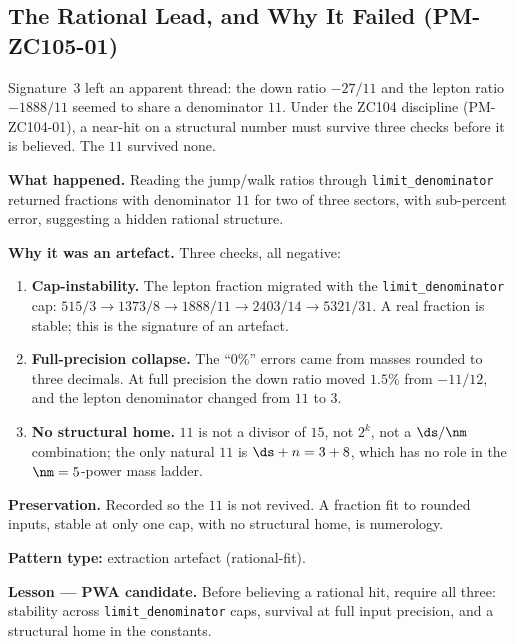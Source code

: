 \documentclass[12pt, a4paper]{article}
\begin{document}
\subsection{The Rational Lead, and Why It Failed (PM-ZC105-01)}
\label{sec:rationale-zc105}

Signature~3 left an apparent thread: the down ratio $-27/11$ and the lepton
ratio $-1888/11$ seemed to share a denominator $11$. Under the ZC104 discipline
(PM-ZC104-01), a near-hit on a structural number must survive three checks before
it is believed. The $11$ survived none.

\begin{derivedbox}[title={PM-ZC105-01: The denominator-$11$ --- a rounding artefact (Failure Stance)}]
\textbf{What happened.} Reading the jump/walk ratios through
\texttt{limit\_denominator} returned fractions with denominator $11$ for two of
three sectors, with sub-percent error, suggesting a hidden rational structure.

\textbf{Why it was an artefact.} Three checks, all negative:
\begin{enumerate}[leftmargin=2em, noitemsep]
  \item \textbf{Cap-instability.} The lepton fraction migrated with the
    \texttt{limit\_denominator} cap: $515/3\to1373/8\to1888/11\to2403/14\to
    5321/31$. A real fraction is stable; this is the signature of an artefact.
  \item \textbf{Full-precision collapse.} The ``$0\%$'' errors came from masses
    rounded to three decimals. At full precision the down ratio moved $1.5\%$
    from $-11/12$, and the lepton denominator changed from $11$ to $3$.
  \item \textbf{No structural home.} $11$ is not a divisor of $15$, not $2^k$,
    not a $\ds/\nm$ combination; the only natural $11$ is $\ds+n=3+8$, which has
    no role in the $\nm=5$-power mass ladder.
\end{enumerate}

\textbf{Preservation.} Recorded so the $11$ is not revived. A fraction fit to
rounded inputs, stable at only one cap, with no structural home, is numerology.

\textbf{Pattern type:} extraction artefact (rational-fit).

\textbf{Lesson --- PWA candidate.} Before believing a rational hit, require all
three: stability across \texttt{limit\_denominator} caps, survival at full input
precision, and a structural home in the constants.
\end{derivedbox}
\end{document}
